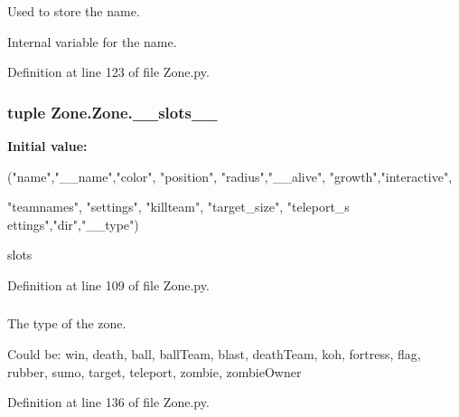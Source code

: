 Used to store the name. 

Internal variable for the name. 

Definition at line 123 of file Zone.py.

\hypertarget{class_zone_1_1_zone_ad5bde96ea6dea6f68ee68d33a6c90850}{
\subsubsection[{\_\-\_\-slots\_\-\_\-}]{\setlength{\rightskip}{0pt plus 5cm}tuple {\bf Zone.Zone.\_\-\_\-slots\_\-\_\-}}}
\label{class_zone_1_1_zone_ad5bde96ea6dea6f68ee68d33a6c90850}
{\bfseries Initial value:}
\begin{DoxyCode}
("name","__name","color", "position", "radius","__alive", "growth","interactive",
       
                  "teamnames", "settings", "killteam", "target_size", "teleport_s
      ettings","dir","__type")
\end{DoxyCode}


slots 



Definition at line 109 of file Zone.py.

\hypertarget{class_zone_1_1_zone_a5164f57edacb2b3a7b3dfca3ba949139}{
\subsubsection[{\_\-\_\-type}]{}}
\label{class_zone_1_1_zone_a5164f57edacb2b3a7b3dfca3ba949139}


The type of the zone. 

Could be: win, death, ball, ballTeam, blast, deathTeam, koh, fortress, flag, rubber, sumo, target, teleport, zombie, zombieOwner 

Definition at line 136 of file Zone.py.

\hypertarget{class_zone_1_1_zone_a0e94d3602835417fef9d1345cf1e739c}{
\subsubsection[{color}]{}}
\label{class_zone_1_1_zone_a0e94d3602835417fef9d1345cf1e739c}


